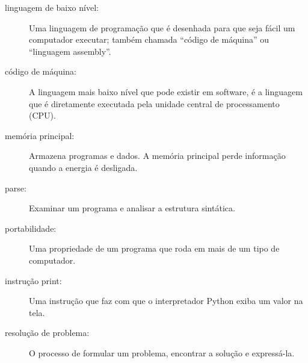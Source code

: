 \begin{description}
\item[linguagem de baixo nível:]  Uma linguagem de programação que é desenhada
para que seja fácil um computador executar; também chamada ``código de máquina'' ou
``linguagem assembly''.
%

\item[código de máquina:]  A linguagem mais baixo nível que pode existir em software, é
a linguagem que é diretamente executada pela unidade central de processamento
(CPU).
%

\item[memória principal:] Armazena programas e dados. A memória principal  
perde informação quando a energia é desligada.
%

\item[parse:]  Examinar um programa e analisar a estrutura sintática.
%

\item[portabilidade:]  Uma propriedade de um programa que roda em 
mais de um tipo de computador.
%

\item[instrução print:]  Uma instrução que faz com que o interpretador Python
exiba um valor na tela.
%

\item[resolução de problema:]  O processo de formular um problema, encontrar 
a solução e expressá-la.
%


\end{description}
